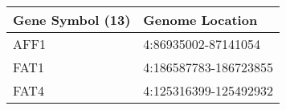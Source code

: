 \begin{tabular}{ll}
\toprule
Gene Symbol (13) &       Genome Location \\
\midrule
            AFF1 &   4:86935002-87141054 \\
            FAT1 & 4:186587783-186723855 \\
            FAT4 & 4:125316399-125492932 \\
\bottomrule
\end{tabular}
